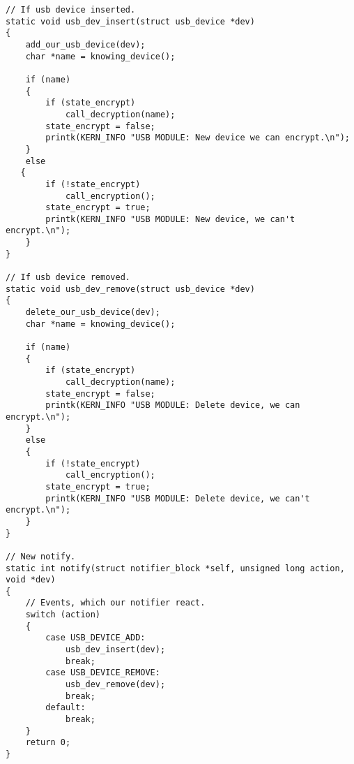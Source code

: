  
    \begin{lstlisting}[caption = Функция-обработчик, label =  lst:notify]
// If usb device inserted.
static void usb_dev_insert(struct usb_device *dev)
{   
    add_our_usb_device(dev);
    char *name = knowing_device();
    
    if (name)
    {
        if (state_encrypt)
            call_decryption(name);
        state_encrypt = false;
        printk(KERN_INFO "USB MODULE: New device we can encrypt.\n");
    }
    else
   {
        if (!state_encrypt)
            call_encryption();
        state_encrypt = true;
        printk(KERN_INFO "USB MODULE: New device, we can't encrypt.\n");
    }
}

// If usb device removed.
static void usb_dev_remove(struct usb_device *dev)
{
    delete_our_usb_device(dev);
    char *name = knowing_device();

    if (name)
    {
        if (state_encrypt)
            call_decryption(name);
        state_encrypt = false; 
        printk(KERN_INFO "USB MODULE: Delete device, we can encrypt.\n");
    }
    else
    {
        if (!state_encrypt)
            call_encryption();
        state_encrypt = true;
        printk(KERN_INFO "USB MODULE: Delete device, we can't encrypt.\n");
    }
}

// New notify.
static int notify(struct notifier_block *self, unsigned long action, void *dev)
{
    // Events, which our notifier react.
    switch (action) 
    {
        case USB_DEVICE_ADD:
            usb_dev_insert(dev);
	        break;
        case USB_DEVICE_REMOVE:
            usb_dev_remove(dev);
	        break;
        default:
	        break;
    }
    return 0;
}
 \end{lstlisting}
 
